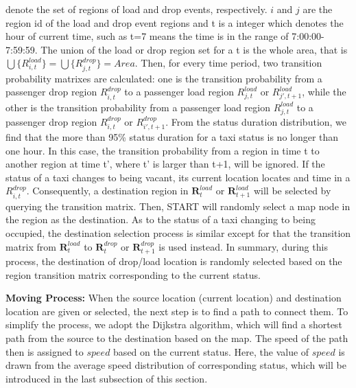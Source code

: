denote the set of regions of load and drop events, respectively. $i$ and $j$ are the region id of the load and drop event regions and t is a integer which denotes the hour of current time, such as t=7 means the time is in the range of 7:00:00-7:59:59. The union of the load or drop region set for a t is the whole area, that is $\bigcup\{R_{i,t}^{load}\}=\bigcup\{R_{j,t}^{drop}\} = Area $.
Then, for every time period, two transition probability matrixes are calculated: one is the transition probability from a passenger drop region $R_{i,t}^{drop}$ to a passenger load region $R_{j,t}^{load}$ or $R_{j',t+1}^{load}$, while the other is the transition probability from a passenger load region $R_{j,t}^{load}$ to a passenger drop region $R_{i,t}^{drop}$ or $R_{i',t+1}^{drop}$. From the status duration distribution, we find that the more than 95\% status duration for a taxi status is no longer than one hour. In this case, the transition probability from a region in time t to another region at time t’, where t’ is larger than t+1,  will be ignored. 
If the status of a taxi changes to being vacant, its current location locates and time in a $R_{i,t}^{drop}$. Consequently, a destination region in $\textbf{R}_{t}^{load}$ or $\textbf{R}_{t+1}^{load}$ will be selected by querying the transition matrix. Then, START will randomly select a map node in the region as the destination. As to the status of a taxi changing to being occupied, the destination selection process is similar except for that the transition matrix from $\textbf{R}_{t}^{load}$ to $\textbf{R}_t^{drop}$ or $\textbf{R}_{t+1}^{drop}$ is used instead. In summary, during this process, the destination of drop/load location is randomly selected based on the region transition matrix corresponding to the current status.

\textbf{Moving Process:} When the source location (current location) and destination location are given or selected, the next step is to find a path to connect them. To simplify the process, we adopt the Dijkstra algorithm, which will find a shortest path from the source to the destination based on the map. The speed of the path then is assigned to $speed$ based on the current status. Here, the value of $speed$ is drawn from the average speed distribution of corresponding status, which will be introduced in the last subsection of this section.



